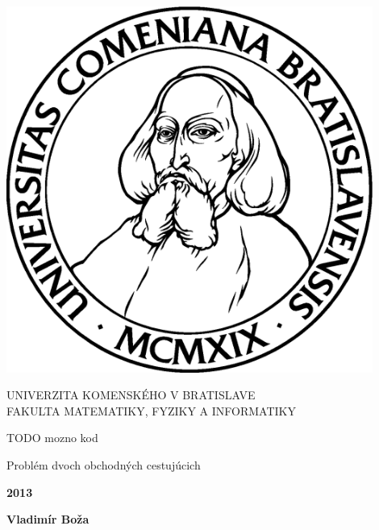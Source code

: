\documentclass[12pt,a4paper]{report}
\begin{document}
\thispagestyle{empty}
\begin{minipage}{0.25\textwidth}
\includegraphics[width=0.9\textwidth]{img/komlogo-new}
\end{minipage}
\begin{minipage}{0.69\textwidth}
\begin{center}
UNIVERZITA KOMENSKÉHO V BRATISLAVE \\
FAKULTA MATEMATIKY, FYZIKY A INFORMATIKY \\
\end{center}
\end{minipage}

\bigskip
TODO mozno kod

\vfill
\begin{center}
\begin{minipage}{0.8\textwidth}
\bigskip\medskip
\centerline{\LARGE\sc Problém dvoch obchodných cestujúcich}
\end{minipage}
\end{center}
\vfill
{\bf 2013}

\hfill{\bf Vladimír Boža}
\eject %
\end{document}
